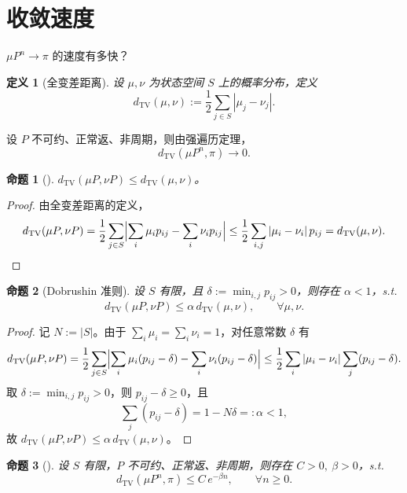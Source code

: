 \documentclass[lang=cn,10pt,newtx,thmcnt=chapter,mode=simple]{vividbook}
\theoremstyle{vividthm}
\newtheorem*{vividproposition}{命题}
\theoremstyle{vividdef}
\newtheorem*{vividdefinition}{定义}
\theoremstyle{vividexa}
\theoremstyle{vividrem}
\renewenvironment{proposition}[1][]{\begin{vividproposition}[#1]}{\end{vividproposition}}
\renewenvironment{definition}[1][]{\begin{vividdefinition}[#1]}{\end{vividdefinition}}
\begin{document}
\clearpage
\section{收敛速度}

$\mu P^n\to\pi$ 的速度有多快？

\begin{definition}[全变差距离]
设 $\mu,\nu$ 为状态空间 $S$ 上的概率分布，定义
\[
d_{\mathrm{TV}}(\mu,\nu):=\frac12\sum_{j\in S}|\mu_j-\nu_j| .
\]
\end{definition}

设 $P$ 不可约、正常返、非周期，则由强遍历定理，
\[
d_{\mathrm{TV}}(\mu P^n,\pi)\longrightarrow 0 .
\]

\begin{proposition}
$d_{\mathrm{TV}}(\mu P,\nu P)\le d_{\mathrm{TV}}(\mu,\nu)$。
\end{proposition}

\begin{proof}
由全变差距离的定义，
\[
d_{\mathrm{TV}}(\mu P,\nu P)
=\frac12\sum_{j\in S}\Bigl|\sum_i\mu_ip_{ij}-\sum_i\nu_ip_{ij}\Bigr|
\le\frac12\sum_{i,j}|\mu_i-\nu_i|\,p_{ij}
=d_{\mathrm{TV}}(\mu,\nu). \qedhere
\]
\end{proof}

\begin{proposition}[Dobrushin 准则]
设 $S$ 有限，且 $\delta:=\min_{i,j}p_{ij}>0$，则存在 $\alpha<1$，s.t.
\[
d_{\mathrm{TV}}(\mu P,\nu P)\le\alpha\,d_{\mathrm{TV}}(\mu,\nu),\qquad \forall\mu,\nu .
\]
\end{proposition}

\begin{proof}
记 $N:=|S|$。由于 $\sum_i\mu_i=\sum_i\nu_i=1$，对任意常数 $\delta$ 有
\[
d_{\mathrm{TV}}(\mu P,\nu P)
=\frac12\sum_{j\in S}\Bigl|\sum_i\mu_i(p_{ij}-\delta)-\sum_i\nu_i(p_{ij}-\delta)\Bigr|
\le\frac12\sum_i|\mu_i-\nu_i|\sum_j(p_{ij}-\delta).
\]
取 $\delta:=\min_{i,j}p_{ij}>0$，则 $p_{ij}-\delta\ge0$，且
\[
\sum_j(p_{ij}-\delta)=1-N\delta=:\alpha<1,
\]
故 $d_{\mathrm{TV}}(\mu P,\nu P)\le\alpha\,d_{\mathrm{TV}}(\mu,\nu)$。 \qedhere
\end{proof}

\begin{proposition}
设 $S$ 有限，$P$ 不可约、正常返、非周期，则存在 $C>0,\ \beta>0$，s.t.
\[
d_{\mathrm{TV}}(\mu P^n,\pi)\le C\,e^{-\beta n},\qquad \forall n\ge0 .
\]
\end{proposition}
\end{document}
